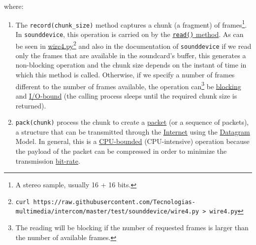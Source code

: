
where:

\begin{enumerate}
\item The \verb|record(chunk_size)| method captures a chunk (a
  fragment) of frames\footnote{A stereo sample, usually 16 + 16
    bits.}. In \verb|sounddevice|, this operation is carried on by the
  \href{https://python-sounddevice.readthedocs.io/en/0.4.0/api/streams.html#sounddevice.Stream.read}{\texttt{read()}
    method}. As can be seen in
  \href{https://raw.githubusercontent.com/Tecnologias-multimedia/intercom/master/test/sounddevice/wire4.py}{wire4.py}\footnote{
    \texttt{curl
      https://raw.githubusercontent.com/Tecnologias-multimedia/intercom/master/test/sounddevice/wire4.py
      > wire4.py}} and also in the documentation of
  \verb|sounddevice| if we read only the frames that are available in
  the soundcard's buffer, this generates a non-blocking operation and
  the chunk size depends on the instant of time in which this method
  is called. Otherwise, if we specify a number of frames different to
  the number of frames available, the operation can\footnote{The
    reading will be blocking if the number of requested frames is
    larger than the number of available frames.} be
  \href{https://python-sounddevice.readthedocs.io/en/0.4.0/api/streams.html#sounddevice.Stream.write}{blocking}
  and \href{https://en.wikipedia.org/wiki/I/O_bound}{I/O-bound} (the
  calling process sleeps until the required chunk size is returned).

\item \verb|pack(chunk)| process the chunk to create a
  \href{https://en.wikipedia.org/wiki/Network_packet}{packet} (or a
  sequence of packets), a structure that can be transmitted through
  the \href{https://en.wikipedia.org/wiki/Internet}{Internet} using the
  \href{https://en.wikipedia.org/wiki/Datagram}{Datagram} Model. In
  general, this is a
  \href{https://en.wikipedia.org/wiki/CPU-bound}{CPU-bounded}
  (CPU-intensive) operation because the payload of the packet can be
  compressed in order to minimize the transmission
  \href{https://en.wikipedia.org/wiki/Bit_rate}{bit-rate}.


\end{enumerate}

